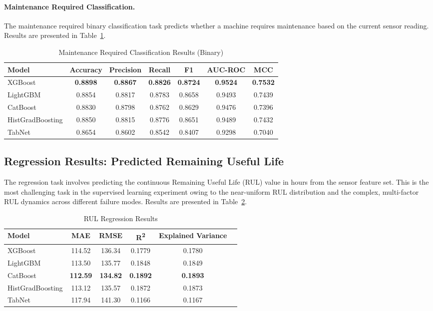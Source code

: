 \paragraph{Maintenance Required Classification.} The maintenance required binary classification task predicts whether a machine requires maintenance based on the current sensor reading. Results are presented in Table~\ref{tab:cls_maintenance}.

\begin{table}[htbp]
\centering
\caption{Maintenance Required Classification Results (Binary)}
\label{tab:cls_maintenance}
\begin{tabular}{lcccccc}
\hline
\textbf{Model} & \textbf{Accuracy} & \textbf{Precision} & \textbf{Recall} & \textbf{F1} & \textbf{AUC-ROC} & \textbf{MCC} \\
\hline
XGBoost              & \textbf{0.8898} & \textbf{0.8867} & \textbf{0.8826} & \textbf{0.8724} & \textbf{0.9524} & \textbf{0.7532} \\
LightGBM             & 0.8854 & 0.8817 & 0.8783 & 0.8658 & 0.9493 & 0.7439 \\
CatBoost             & 0.8830 & 0.8798 & 0.8762 & 0.8629 & 0.9476 & 0.7396 \\
HistGradBoosting     & 0.8850 & 0.8815 & 0.8776 & 0.8651 & 0.9489 & 0.7432 \\
TabNet               & 0.8654 & 0.8602 & 0.8542 & 0.8407 & 0.9298 & 0.7040 \\
\hline
\end{tabular}
\end{table}

\subsection{Regression Results: Predicted Remaining Useful Life}

The regression task involves predicting the continuous Remaining Useful Life (RUL) value in hours from the sensor feature set. This is the most challenging task in the supervised learning experiment owing to the near-uniform RUL distribution and the complex, multi-factor RUL dynamics across different failure modes. Results are presented in Table~\ref{tab:reg_rul}.

\begin{table}[htbp]
\centering
\caption{RUL Regression Results}
\label{tab:reg_rul}
\begin{tabular}{lccccc}
\hline
\textbf{Model} & \textbf{MAE} & \textbf{RMSE} & \textbf{R\textsuperscript{2}} & \textbf{Explained Variance} \\
\hline
XGBoost              & 114.52 & 136.34 & 0.1779 & 0.1780 \\
LightGBM             & 113.50 & 135.77 & 0.1848 & 0.1849 \\
CatBoost             & \textbf{112.59} & \textbf{134.82} & \textbf{0.1892} & \textbf{0.1893} \\
HistGradBoosting     & 113.12 & 135.57 & 0.1872 & 0.1873 \\
TabNet               & 117.94 & 141.30 & 0.1166 & 0.1167 \\
\hline
\end{tabular}
\end{table}

